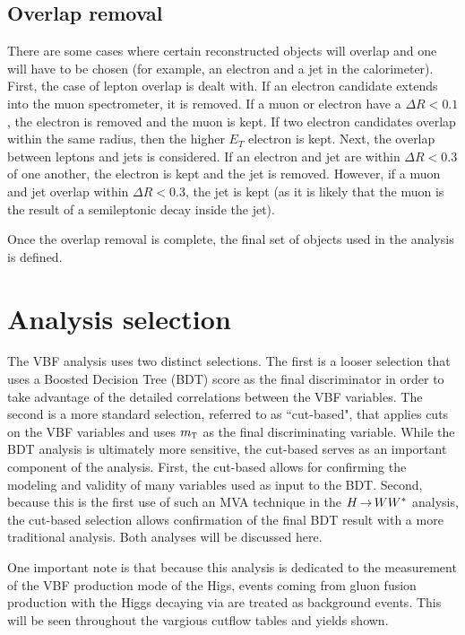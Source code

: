 \subsection{Overlap removal}

There are some cases where certain reconstructed objects will overlap and one will have to be chosen (for example, an electron and a jet in the calorimeter). First, the case of lepton overlap is dealt with. If an electron candidate extends into the muon spectrometer, it is removed. If a muon or electron have a $\Delta R < 0.1$, the electron is removed and the muon is kept. If two electron candidates overlap within the same radius, then the higher $E_{T}$ electron is kept. Next, the overlap between leptons and jets is considered. If an electron and jet are within $\Delta R < 0.3$ of one another, the electron is kept and the jet is removed. However, if a muon and jet overlap within $\Delta R < 0.3$, the jet is kept (as it is likely that the muon is the result of a semileptonic decay inside the jet). 

Once the overlap removal is complete, the final set of objects used in the analysis is defined. 


\section{Analysis selection}

The VBF analysis uses two distinct selections. The first is a looser selection that uses a Boosted Decision Tree (BDT) score as the final discriminator in order to take advantage of the detailed correlations between the VBF variables. The second is a more standard selection, referred to as ``cut-based", that applies cuts on the VBF variables and uses $m_{\textrm{\footnotesize\sc t}}$ as the final discriminating variable. While the BDT analysis is ultimately more sensitive, the cut-based serves as an important component of the analysis. First, the cut-based allows for confirming the modeling and validity of many variables used as input to the BDT. Second, because this is the first use of such an MVA technique in the $H{\,{\rightarrow}\,}WW^\ast$ analysis, the cut-based selection allows confirmation of the final BDT result with a more traditional analysis. Both analyses will be discussed here. 

One important note is that because this analysis is dedicated to the measurement of the VBF production mode of the Higs, events coming from gluon fusion production with the Higgs decaying via \HWWfull are treated as background events. This will be seen throughout the vargious cutflow tables and yields shown. 

